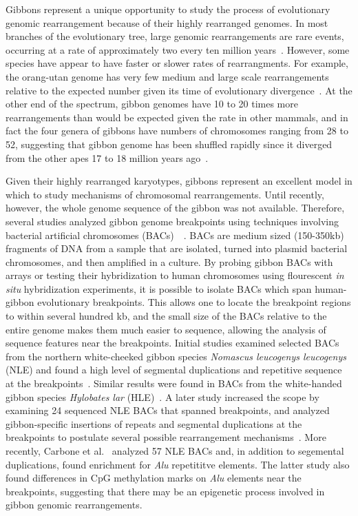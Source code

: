 Gibbons represent a unique opportunity to study the process of evolutionary genomic rearrangement because of their highly rearranged genomes. In most branches of the evolutionary tree, large genomic rearrangements are rare events, occurring at a rate of approximately two every ten million years~\cite{Wienberg:2004gt}. However, some species have appear to have faster or slower rates of rearrangments. For example, the orang-utan genome has very few medium and large scale rearrangements relative to the expected number given its time of evolutionary divergence~\cite{Locke:2011gn}. At the other end of the spectrum, gibbon genomes have 10 to 20 times more rearrangements than would be expected given the rate in other mammals, and in fact the four genera of gibbons have numbers of chromosomes ranging from 28 to 52, suggesting that gibbon genome has been shuffled rapidly since it diverged from the other apes 17 to 18 million years ago~\cite{Misceo:2008kg}.

Given their highly rearranged karyotypes, gibbons represent an excellent model in which to study mechanisms of chromosomal rearrangements. Until recently, however, the whole genome sequence of the gibbon was not available. Therefore, several studies analyzed gibbon genome breakpoints using techniques involving bacterial artificial chromosomes (BACs)~~\cite{Girirajan:2009kw,Carbone:2006jk,Carbone:2009p1012}. BACs are medium sized (150-350kb) fragments of DNA from a sample that are isolated, turned into plasmid bacterial chromosomes, and then amplified in a culture. By probing gibbon BACs with arrays or testing their hybridization to human chromosomes using flourescent \emph{in situ} hybridization experiments, it is possible to isolate BACs which span human-gibbon evolutionary breakpoints. This allows one to locate the breakpoint regions to within several hundred kb, and the small size of the BACs relative to the entire genome makes them much easier to sequence, allowing the analysis of sequence features near the breakpoints. Initial studies examined selected BACs from the northern white-cheeked gibbon species \emph{Nomascus leucogenys leucogenys} (NLE) and found a high level of segmental duplications and repetitive sequence at the breakpoints~\cite{Carbone:2006jk,Roberto:2007dt}. Similar results were found in BACs from the white-handed gibbon species \emph{Hylobates lar} (HLE)~\cite{Misceo:2008kg}. A later study increased the scope by examining 24 sequenced NLE BACs that spanned breakpoints, and analyzed gibbon-specific insertions of repeats and segmental duplications at the breakpoints to postulate several possible rearrangement mechanisms~\cite{Girirajan:2009kw}. More recently, Carbone et al.~\cite{Carbone:2009p1012} analyzed 57 NLE BACs and, in addition to segemental duplications, found enrichment for \emph{Alu} repetititve elements. The latter study also found differences in CpG methylation marks on \emph{Alu} elements near the breakpoints, suggesting that there may be an epigenetic process involved in gibbon genomic rearrangements.

